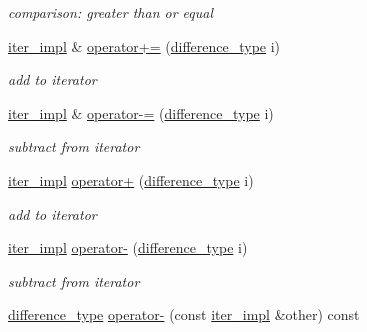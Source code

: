 \begin{DoxyCompactItemize}
\begin{DoxyCompactList}\small\item\em comparison\+: greater than or equal \end{DoxyCompactList}\item 
\hyperlink{classnlohmann_1_1basic__json_1_1iter__impl}{iter\+\_\+impl} \& \hyperlink{classnlohmann_1_1basic__json_1_1iter__impl_a170970e99b7a6d124da0fffa4cb76dba}{operator+=} (\hyperlink{classnlohmann_1_1basic__json_1_1iter__impl_aa3d908ee643e5938d32e5f6d261d7715}{difference\+\_\+type} i)
\begin{DoxyCompactList}\small\item\em add to iterator \end{DoxyCompactList}\item 
\hyperlink{classnlohmann_1_1basic__json_1_1iter__impl}{iter\+\_\+impl} \& \hyperlink{classnlohmann_1_1basic__json_1_1iter__impl_a9fd84e884e8474c000dc966d331a4854}{operator-\/=} (\hyperlink{classnlohmann_1_1basic__json_1_1iter__impl_aa3d908ee643e5938d32e5f6d261d7715}{difference\+\_\+type} i)
\begin{DoxyCompactList}\small\item\em subtract from iterator \end{DoxyCompactList}\item 
\hyperlink{classnlohmann_1_1basic__json_1_1iter__impl}{iter\+\_\+impl} \hyperlink{classnlohmann_1_1basic__json_1_1iter__impl_a3b4cd7db9a93609f8e05f1759d38d633}{operator+} (\hyperlink{classnlohmann_1_1basic__json_1_1iter__impl_aa3d908ee643e5938d32e5f6d261d7715}{difference\+\_\+type} i)
\begin{DoxyCompactList}\small\item\em add to iterator \end{DoxyCompactList}\item 
\hyperlink{classnlohmann_1_1basic__json_1_1iter__impl}{iter\+\_\+impl} \hyperlink{classnlohmann_1_1basic__json_1_1iter__impl_a926f2f9189403e72e4f694a06d4d021a}{operator-\/} (\hyperlink{classnlohmann_1_1basic__json_1_1iter__impl_aa3d908ee643e5938d32e5f6d261d7715}{difference\+\_\+type} i)
\begin{DoxyCompactList}\small\item\em subtract from iterator \end{DoxyCompactList}\item 
\hyperlink{classnlohmann_1_1basic__json_1_1iter__impl_aa3d908ee643e5938d32e5f6d261d7715}{difference\+\_\+type} \hyperlink{classnlohmann_1_1basic__json_1_1iter__impl_a3bedce4ada748251e86c7924be54e210}{operator-\/} (const \hyperlink{classnlohmann_1_1basic__json_1_1iter__impl}{iter\+\_\+impl} \&other) const

\end{DoxyCompactItemize}
